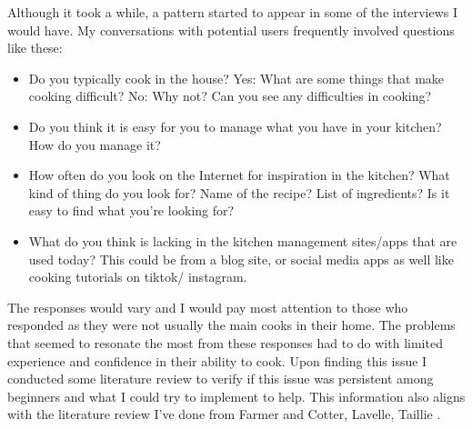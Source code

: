 \documentclass[10pt,twocolumn]{article}
\begin{document}
Although it took a while, a pattern started to appear in some of the interviews I would have. My conversations with potential users frequently involved questions like these: 
\begin{itemize}
    \item Do you typically cook in the house? 
    Yes: What are some things that make cooking difficult?
    No: Why not? Can you see any difficulties in cooking?

    \item Do you think it is easy for you to manage what you have in your kitchen?
    How do you manage it? 
 
    \item How often do you look on the Internet for inspiration in the kitchen?
    What kind of thing do you look for? Name of the recipe? List of ingredients? 
    Is it easy to find what you’re looking for?
    
    \item What do you think is lacking in the kitchen management sites/apps that are used today? This could be from a blog site, or social media apps as well like cooking tutorials on tiktok/ instagram. 
\end{itemize}
The responses would vary and I would pay most attention to those who responded as they were not usually the main cooks in their home. The problems that seemed to resonate the most from these responses had to do with limited experience and confidence in their ability to cook. Upon finding this issue I conducted some literature review to verify if this issue was persistent among beginners and what I could try to implement to help. This information also aligns with the literature review I've done from Farmer and Cotter\cite{Farmer2021}, Lavelle\cite{Lavelle2016}, Taillie \cite{Taillie2018}.
\end{document}
